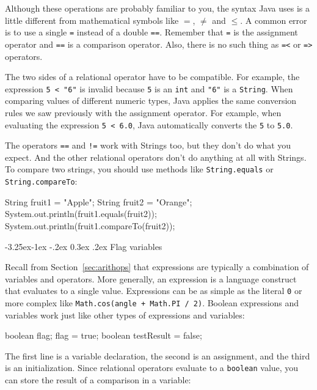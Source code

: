 \documentclass[12pt]{book}
\makeatletter
\renewcommand\subsection{\@startsection{subsection}{2}{\z@}%
    {-3.25ex\@plus -1ex \@minus -.2ex}%
    {0.3ex \@plus .2ex}%
    {\normalfont\large\bfseries}}
\theoremstyle{exercise}
\newcommand{\java}[1]{\lstinline{#1}} %
\makeatother
\begin{document}
Although these operations are probably familiar to you, the syntax Java uses is a little different from mathematical symbols like $=$, $\neq$ and $\le$.
A common error is to use a single {\tt =} instead of a double {\tt ==}.
Remember that {\tt =} is the assignment operator and {\tt ==} is a comparison operator.
Also, there is no such thing as {\tt =<} or {\tt =>} operators.

The two sides of a relational operator have to be compatible.
For example, the expression \java{5 < "6"} is invalid because \java{5} is an \java{int} and \java{"6"} is a \java{String}.
When comparing values of different numeric types, Java applies the same conversion rules we saw previously with the assignment operator.
For example, when evaluating the expression \java{5 < 6.0}, Java automatically converts the \java{5} to \java{5.0}.

The operators {\tt ==} and {\tt !=} work with Strings too, but they don't do what you expect.
And the other relational operators don't do anything at all with Strings.
To compare two strings, you should use methods like \java{String.equals} or \java{String.compareTo}:

\begin{code}
    String fruit1 = "Apple";
    String fruit2 = "Orange";
    System.out.println(fruit1.equals(fruit2));
    System.out.println(fruit1.compareTo(fruit2));
\end{code}

\subsection{Flag variables}


Recall from Section~\ref{sec:arithops} that expressions are typically a combination of variables and operators.
More generally, an expression is a language construct that evaluates to a single value.
Expressions can be as simple as the literal \java{0} or more complex like \java{Math.cos(angle + Math.PI / 2)}.
Boolean expressions and variables work just like other types of expressions and variables:

\begin{code}
    boolean flag;
    flag = true;
    boolean testResult = false;
\end{code}


The first line is a variable declaration, the second is an assignment, and the third is an initialization.
Since relational operators evaluate to a \java{boolean} value, you can store the result of a comparison in a variable:
\end{document}

